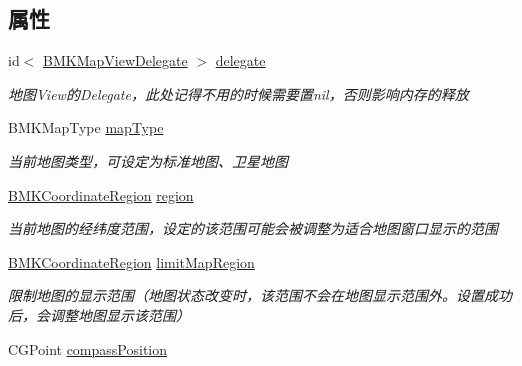 \subsection*{属性}
\begin{DoxyCompactItemize}
\item 
\hypertarget{interface_b_m_k_map_view_a80806d05b9f82dcf5630110b5d20dc2c}{}id$<$ \hyperlink{protocol_b_m_k_map_view_delegate-p}{B\+M\+K\+Map\+View\+Delegate} $>$ \hyperlink{interface_b_m_k_map_view_a80806d05b9f82dcf5630110b5d20dc2c}{delegate}\label{interface_b_m_k_map_view_a80806d05b9f82dcf5630110b5d20dc2c}

\begin{DoxyCompactList}\small\item\em 地图\+View的\+Delegate，此处记得不用的时候需要置nil，否则影响内存的释放 \end{DoxyCompactList}\item 
\hypertarget{interface_b_m_k_map_view_add5778e2d3c080b0ae2ce63538082fea}{}B\+M\+K\+Map\+Type \hyperlink{interface_b_m_k_map_view_add5778e2d3c080b0ae2ce63538082fea}{map\+Type}\label{interface_b_m_k_map_view_add5778e2d3c080b0ae2ce63538082fea}

\begin{DoxyCompactList}\small\item\em 当前地图类型，可设定为标准地图、卫星地图 \end{DoxyCompactList}\item 
\hypertarget{interface_b_m_k_map_view_ae54e847bb82b4e087ced8dc399a2d020}{}\hyperlink{struct_b_m_k_coordinate_region}{B\+M\+K\+Coordinate\+Region} \hyperlink{interface_b_m_k_map_view_ae54e847bb82b4e087ced8dc399a2d020}{region}\label{interface_b_m_k_map_view_ae54e847bb82b4e087ced8dc399a2d020}

\begin{DoxyCompactList}\small\item\em 当前地图的经纬度范围，设定的该范围可能会被调整为适合地图窗口显示的范围 \end{DoxyCompactList}\item 
\hypertarget{interface_b_m_k_map_view_a6a59a9550bf3117bd829562281d772a7}{}\hyperlink{struct_b_m_k_coordinate_region}{B\+M\+K\+Coordinate\+Region} \hyperlink{interface_b_m_k_map_view_a6a59a9550bf3117bd829562281d772a7}{limit\+Map\+Region}\label{interface_b_m_k_map_view_a6a59a9550bf3117bd829562281d772a7}

\begin{DoxyCompactList}\small\item\em 限制地图的显示范围（地图状态改变时，该范围不会在地图显示范围外。设置成功后，会调整地图显示该范围） \end{DoxyCompactList}\item 
\hypertarget{interface_b_m_k_map_view_adad44db2dcfaa2d92e5eabef40f32bd8}{}C\+G\+Point \hyperlink{interface_b_m_k_map_view_adad44db2dcfaa2d92e5eabef40f32bd8}{compass\+Position}\label{interface_b_m_k_map_view_adad44db2dcfaa2d92e5eabef40f32bd8}


\end{DoxyCompactItemize}
